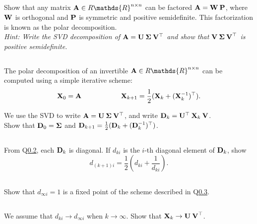 \subsection{} Show that any matrix  ${\bf A} \in R\mathds{R}^{n \times n}$ can be factored ${\bf A} = {\bf W\:P}$, where  ${\bf W}$ is orthogonal and  ${\bf P}$ is symmetric and positive semidefinite. This factorization is known as the polar decomposition.\\
\textit{Hint: Write the SVD decomposition of ${\bf A} = {\bf U \: \Sigma \: V^\top}$ and show that ${\bf V \: \Sigma \: V}^\top$ is positive semidefinite.}

\subsection{}\label{scheme} The polar decomposition of an invertible ${\bf A} \in R\mathds{R}^{n \times n}$ can be computed using a simple iterative scheme:
$$ {\bf X}_0 = {\bf A} \text{\hspace{2cm}} {\bf X}_{k+1} = \frac{1}{2}({\bf X}_k + ({\bf X}_k^{-1})^\top).$$

We use the SVD to write ${\bf A} = {\bf U \: \Sigma \: V^\top}$, and write  ${\bf D}_k = {\bf U}^\top \: {\bf X}_k \: {\bf V}$.\\ Show that ${\bf D}_0 = {\bf \Sigma}$ and ${\bf D}_{k+1} = \frac{1}{2}({\bf D}_k + ({\bf D}_k^{-1})^\top)$.

\subsection{}\label{scheme_diag} From Q\ref{scheme}, each ${\bf D}_k$ is diagonal. If $d_{ki}$ is the $i$-th diagonal element of ${\bf D}_k$, show
$$ d_{(k+1)i} = \frac{1}{2} \left(d_{ki} + \frac{1}{d_{ki}}\right). $$


\subsection{}\label{conv} Show that $d_{\infty i} = 1$ is a fixed point of the scheme described in Q\ref{scheme_diag}.

\subsection{} We assume that $d_{ki} \to d_{\infty i}$ when $k \to \infty$. Show that ${\bf X}_k \to {\bf U \: V}^\top$.

